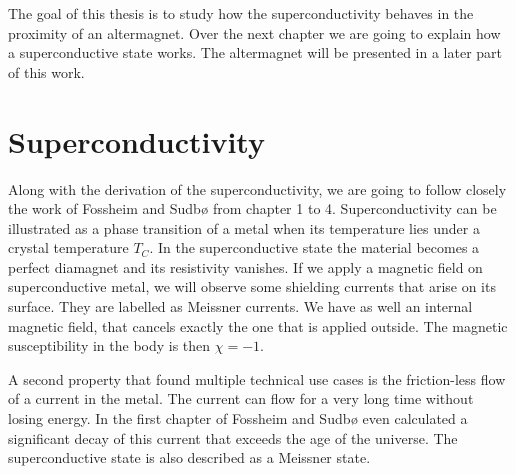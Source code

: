 \documentclass[../main.tex]{subfile}
\begin{document}
The goal of this thesis is to study how the superconductivity behaves in the proximity of an altermagnet. 
Over the next chapter we are going to explain how a superconductive state works. The altermagnet will be presented in a later part of this work.\\

\newpage
\section{Superconductivity}

Along with the derivation of the superconductivity, we are going to follow closely the work of Fossheim and Sudbø \cite{FossheimSudbo2004} from chapter 1 to 4.
Superconductivity can be illustrated as a phase transition of a metal when its temperature lies under a crystal temperature $T_C$. In the superconductive state the material 
becomes a perfect diamagnet and its resistivity vanishes. If we apply a magnetic field on superconductive metal, we will observe some shielding currents that arise on its surface.
They are labelled as Meissner currents. We have as well an internal magnetic field, that cancels exactly the one
that is applied outside. The magnetic susceptibility in the body is then $\chi = -1$.

A second property that found multiple technical use cases is the friction-less flow of a current in the metal. The current can flow for a very long time without losing energy. 
In the first chapter of \cite{FossheimSudbo2004} Fossheim and Sudbø even calculated a significant decay of this current that exceeds the age of the universe.
The superconductive state is also described as a Meissner state.\\ 
\end{document}
